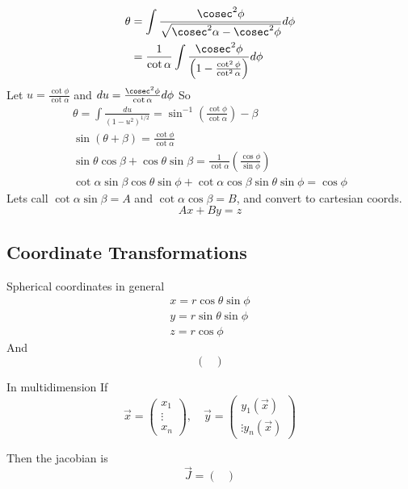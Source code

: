 \documentclass{X:/Documents/Coding/Latex/myassignment}
\begin{document}
\begin{align*}
	\theta &= \int \frac{\cosec^2\phi}{\sqrt{\cosec^2 \alpha - \cosec^2 \phi}} d\phi\\
	&= \frac{1}{\cot \alpha} \int \frac{\cosec^2 \phi}{\left(1 - \frac{\cot^2\phi}{\cot^2 \alpha}\right)} d\phi
\end{align*}
Let $u = \frac{\cot\phi}{\cot \alpha}$ and $du = \frac{\cosec^2\phi}{\cot \alpha} d\phi$
So
\begin{align*}
	\theta = \int \frac{du}{(1-u^2)^{1/2}} = \sin^{-1} \left(\frac{\cot\phi}{\cot \alpha}\right) - \beta\\
	\sin(\theta + \beta) = \frac{\cot \phi}{\cot \alpha}\\
	\sin\theta \cos \beta + \cos\theta \sin \beta = \frac{1}{\cot \alpha} \left(\frac{\cos\phi}{\sin\phi}\right)\\
	\cot \alpha \sin \beta \cos \theta \sin \phi + \cot \alpha \cos \beta \sin \theta \sin \phi = \cos \phi	
\end{align*}
Lets call $\cot \alpha\sin \beta = A$ and $\cot \alpha \cos \beta = B$, and convert to cartesian coords.
\[Ax + By = z\]


\subsection{Coordinate Transformations}

Spherical coordinates in general
\begin{align*}
	x = r\cos \theta \sin \phi\\
	y = r\sin\theta \sin \phi\\ 
	z = r\cos\phi
\end{align*}
And
\[\begin{pmatrix}
	
\end{pmatrix}\]

In multidimension
If
\[\vec x = \begin{pmatrix}
	x_1\\\vdots\\x_n
\end{pmatrix}, \quad \vec y = \begin{pmatrix}
	y_1(\vec x)\\\vdots y_n(\vec x)
\end{pmatrix}\]

Then the jacobian is
\[\vec J = \begin{pmatrix}
	
\end{pmatrix}\]
\end{document}

